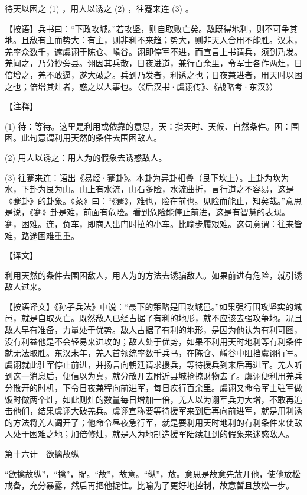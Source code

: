 \documentclass[12pt,UTF8]{ctexbook}
\begin{document}
待天以困之 (1) ，用人以诱之 (2) ，往蹇来连 (3) 。

【按语】兵书曰：“下政攻城。”若攻坚，则自取败亡矣。敌既得地利，则不可争其地。且敌有主而势大：有主，则非利不来趋；势大，则非天人合用不能胜。汉末，羌率众数千，遮虞诩于陈仓、崤谷。诩即停军不进，而宣言上书请兵，须到乃发。羌闻之，乃分抄旁县。诩因其兵散，日夜进道，兼行百余里，令军士各作两灶，日倍增之，羌不敢逼，遂大破之。兵到乃发者，利诱之也；日夜兼进者，用天时以困之也；倍增其灶者，惑之以人事也。（《后汉书·虞诩传》、《战略考·东汉》）





【注释】


(1) 待：等待。这里是利用或依靠的意思。天：指天时、天候、自然条件。困：围困。此句意谓利用天然的条件去围困敌人。

(2) 用人以诱之：用人为的假象去诱惑敌人。

(3) 往蹇来连：语出《易经·蹇卦》。本卦为异卦相叠（艮下坎上）。上卦为坎为水，下卦为艮为山。山上有水流，山石多险，水流曲折，言行道之不容易，这是《蹇卦》的卦象。《彖》曰：“《蹇》，难也，险在前也。见险而能止，知矣哉。”意思是说，《蹇》卦是难，前面有危险。看到危险能停止前进，这是有智慧的表现。蹇，困难。连，负车，即商人出门时拉的小车。比喻步履艰难。这句意谓：往来皆难，路途困难重重。

【译文】

利用天然的条件去围困敌人，用人为的方法去诱骗敌人。如果前进有危险，就引诱敌人过来。

【按语译文】《孙子兵法》中说：“最下的策略是围攻城邑。”如果强行围攻坚实的城邑，就是自取灭亡。既然敌人已经占据了有利的地形，就不应该去强攻争地。况且敌人早有准备，力量处于优势。敌人占据了有利的地形，是因为他认为有利可图，没有利益他是不会轻易来进攻的；敌人处于优势，如果不利用天时地利等有利条件就无法取胜。东汉末年，羌人首领统率数千兵马，在陈仓、崤谷中阻挡虞诩行军。虞诩就此驻军停止前进，并扬言向朝廷请求援兵，等待援兵到来后再进军。羌人听到这一消息后，便信以为真，就分散开去附近县城抢掠财物去了。虞诩便利用羌兵分散开的时机，下令日夜兼程向前进军，每日疾行百余里。虞诩又命令军士驻军做饭时做两个灶，如此则灶的数量每日增加一倍，羌人以为诩军兵力大增，不敢再追击他们，结果虞诩大破羌兵。虞诩宣称要等待援军来到后再向前进军，就是用利诱的方法将羌人调开了；他命令昼夜急行军，就是要利用天时地利的有利条件来使敌人处于困难之地；加倍修灶，就是人为地制造援军陆续赶到的假象来迷惑敌人。





第十六计　欲擒故纵


“欲擒故纵”，“擒”，捉。“故”，故意。“纵”，放。意思是故意先放开他，使他放松戒备，充分暴露，然后再把他捉住。比喻为了更好地控制，故意暂且放松一步。
\end{document}
